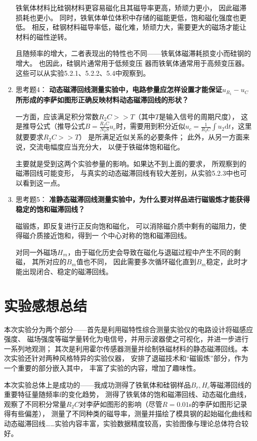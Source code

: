 \documentclass[11pt]{article}
\begin{document}
\begin{enumerate}
铁氧体材料比硅钢材料更容易磁化且其磁导率更高，矫顽力更小，
因此磁滞损耗也更小。
同时，铁氧体单位体积中存储的磁能更低，饱和磁化强度也更低。
相反，硅钢材料磁导率低，磁化难，矫顽力大，需要更大的磁场才能让材料的磁性逆转。

且随频率的增大，二者表现出的特性也不同——铁氧体磁滞耗损变小而硅钢的增大。
也因此，硅钢片通常用于低频变压
器而铁氧体通常用于高频变压器。
这些可以从实验5.2.1、5.2.2、5.4中观察到。

    \item 思考题4：  \textbf{动态磁滞回线测量实验中，电路参量应怎样设置才能保证$u_{R_1}-u_C$所形成的李萨如图形正确反映材料动态磁滞回线的形状？}

一方面，应该满足积分常数$R_2C>>T$（其中$T$是输入信号的周期尺度），
这是推导公式（推导公式$B=\frac{R_2 C}{N_2 S}u_c$时，需要用到积分近似$u_c=\frac{1}{R_2 C}\int u_2\mathrm d t$，这里就要要求$R_2C>>T$）
是所满足近似关系的必要条件；
此外，从另一方面来说，交流电幅度应当充分大，
以便于铁磁体饱和磁化。

主要就是受到这两个实验参量的影响。如果达不到上面的要求，
所观察到的磁滞回线可能变形，
与真实的动态磁滞回线有较大差别，从实验5.2.3中也可以看到这一点。


    \item 思考题5：  \textbf{准静态磁滞回线测量实验中，为什么要对样品进行磁锻炼才能获得稳定的饱和磁滞回线？}
    
    磁锻炼，即反复进行正反向饱和磁化，
    可以消除磁介质中剩有的磁阻力，使得磁介质接近饱和，得到一
个中心对称的饱和磁滞回线。
    
    对同一外磁场$H_m$，由于磁化历史会导致在磁化与退磁过程中产生不同的剩磁，
    其所对应的$B_m$值也不同，
    因此需要多次循环磁化直到$B_m$稳定，此时才能出现闭合、稳定的磁滞回线。

    
\end{enumerate}



\newpage
\section{实验感想总结}

本次实验分为两个部分——首先是利用磁特性综合测量实验仪的电路设计将磁感应强度、
磁场强度等磁学量转化为电信号，并用示波器使之可视化，并进一步进行一系列地观测；
其次是利用霍尔传感器测量并绘制铁磁材料的静态磁滞回线。本次实验还针对两种风格特异的实验仪器，
安排了退磁技术和“磁锻炼”部分，作为一个重要的部分嵌入其中，
丰富了实验的内容，增加了趣味性。

本次实验总体上是成功的——我成功测得了铁氧体和硅钢样品$B_r,H_c$等磁滞回线的重要特征量随频率f的变化趋势，
测得了铁氧体的饱和磁滞回线、动态磁化曲线，观察了不同积分常量$R_2 C$对李萨如图形的影响（尽管$R=0.01$s的李萨如图形记录得有些偏差），
测量了不同种类的磁导率，测量并描绘了模具钢的起始磁化曲线和动态磁滞回线……实验内容丰富，实验数据精度较高，实验图像与理论总体符合较好。
\end{document}
